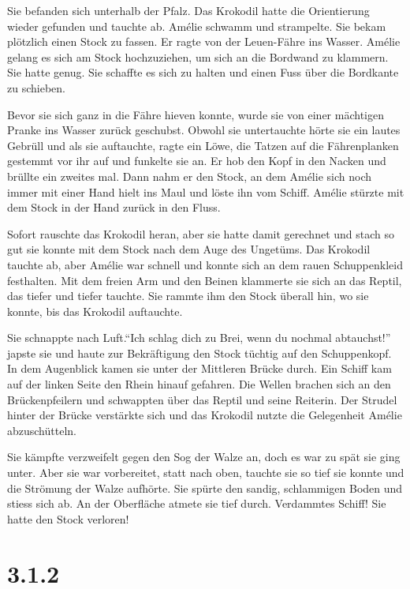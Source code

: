 \documentclass[11pt,titlepage,a5paper]{book}
\begin{document}
Sie befanden sich unterhalb der Pfalz. Das Krokodil hatte die Orientierung wieder gefunden und tauchte ab. Amélie schwamm und strampelte. Sie bekam plötzlich einen Stock zu fassen. Er ragte von der Leuen-Fähre ins Wasser. Amélie gelang es sich am Stock hochzuziehen, um sich an die Bordwand zu klammern. Sie hatte genug. Sie schaffte es sich zu halten und einen Fuss über die Bordkante zu schieben. 

Bevor sie sich ganz in die Fähre hieven konnte, wurde sie von einer mächtigen Pranke ins Wasser zurück geschubst. Obwohl sie untertauchte hörte sie ein lautes Gebrüll und als sie auftauchte, ragte ein Löwe, die Tatzen auf die Fährenplanken gestemmt vor ihr auf und funkelte sie an. Er hob den Kopf in den Nacken und brüllte ein zweites mal. Dann nahm er den Stock, an dem Amélie sich noch immer mit einer Hand hielt ins Maul und löste ihn vom Schiff. Amélie stürzte mit dem Stock in der Hand zurück in den Fluss.

Sofort rauschte das Krokodil heran, aber sie hatte damit gerechnet und stach so gut sie konnte mit dem Stock nach dem Auge des Ungetüms. Das Krokodil tauchte ab, aber Amélie war schnell und konnte sich an dem rauen Schuppenkleid festhalten. Mit dem freien Arm und den Beinen klammerte sie sich an das Reptil, das tiefer und tiefer tauchte. Sie rammte ihm den Stock überall hin, wo sie konnte, bis das Krokodil auftauchte. 

Sie schnappte nach Luft."`Ich schlag dich zu Brei, wenn du nochmal abtauchst!"' japste sie und haute zur Bekräftigung den Stock tüchtig auf den Schuppenkopf. In dem Augenblick kamen sie unter der Mittleren Brücke durch. Ein Schiff kam auf der linken Seite den Rhein hinauf gefahren. Die Wellen brachen sich an den Brückenpfeilern und schwappten über das Reptil und seine Reiterin. Der Strudel hinter der Brücke verstärkte sich und das Krokodil nutzte die Gelegenheit Amélie abzuschütteln. 

Sie kämpfte verzweifelt gegen den Sog der Walze an, doch es war zu spät sie ging unter. Aber sie war vorbereitet, statt nach oben, tauchte sie so tief sie konnte und die Strömung der Walze aufhörte. Sie spürte den sandig, schlammigen Boden und stiess sich ab. An der Oberfläche atmete sie tief durch. Verdammtes Schiff! Sie hatte den Stock verloren! 

\section*{3.1.2}
\end{document}
